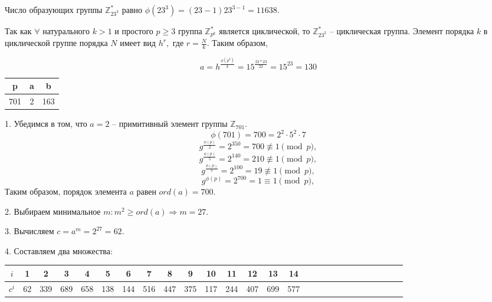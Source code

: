 \documentclass[a4paper,11pt,openany]{book}
\begin{document}

Число образующих группы $\mathbb{Z}_{23^3}^*$ равно $\phi(23^3) = (23 - 1) 23 ^ {3 - 1} = 11638.$


Так как $\forall$ натурального $k>1$ и простого $p \ge 3$ группа $\mathbb{Z}_{p^k}^*$ является циклической, то $\mathbb{Z}_{23^2}^*$ -- циклическая группа. Элемент порядка $k$ в циклической группе порядка $N$ имеет вид $h^r,$ где $r = \frac{N}{k}.$ Таким образом,

$$ a = h ^ { \frac{\phi(p ^ 2)}{k} } = 15 ^ { \frac{22 * 23}{22} } = 15 ^ {23} = 130 $$


\medskip

{\centering
\begin{tabular}{||c|c|c||}
\hline
\textbf{p} & \textbf{a} & \textbf{b} \\
\hline
701 & 2 & 163 \\
\hline
\end{tabular}

}

\medskip

1. Убедимся в том, что $a=2$ -- примитивный элемент группы $\mathbb{Z}_{701}$.
$$\phi(701) = 700 = 2^2 \cdot 5^2 \cdot 7$$
$$ g^{ \frac{\phi(p)}{2} } = 2 ^ {350} = 700 \not\equiv 1 \pmod p,$$
$$ g^{ \frac{\phi(p)}{5} } = 2 ^ {140} = 210 \not\equiv 1 \pmod p,$$
$$ g^{ \frac{\phi(p)}{7} } = 2 ^ {100} = 19 \not\equiv 1 \pmod p,$$
$$ g^{ \phi(p) } = 2 ^ {700} = 1 \equiv 1 \pmod p,$$
\noindent Таким образом, порядок элемента $a$ равен $ord(a) = 700$.

2. Выбираем минимальное $m \colon m^2 \ge ord(a) \Rightarrow m = 27.$ 

3. Вычисляем $c = a^m = 2 ^ {27} = 62.$

4. Составляем два множества:

\medskip

{\centering
\begin{tabular}{||c|c|c|c|c|c|c|c|c|c|c|c|c|c|c|c|c|c|c|c|c|c|c|c|c|c|c||}
\hline
$i$ & 1 & 2 & 3 & 4 & 5 & 6 & 7 & 8 & 9 & 10 & 11 & 12 & 13 & 14 \\
\hline
$c^i$ & 62 & 339 & 689 & 658 & 138 & 144 & 516 & 447 & 375 & 117 & 244 & 407 & 699 & 577 \\
\hline
\end{tabular}

}
\end{document}
